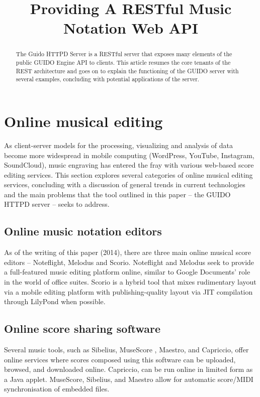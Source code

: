 \documentclass{article}
\title{Providing A RESTful Music Notation Web API}
\date{}
\begin{document}
\maketitle

\begin{abstract}

The Guido HTTPD Server is a RESTful server that exposes many elements of the public GUIDO Engine API to clients.  This article resumes the core tenants of the REST architecture and goes on to explain the functioning of the GUIDO server with several examples, concluding with potential applications of the server.
\end{abstract}


\section{Online musical editing}\label{section:online-musical-editing}
As client-server models for the processing, visualizing and analysis of data become more widespread in mobile computing (WordPress, YouTube, Instagram, SoundCloud), music engraving has entered the fray with various web-based score editing services.  This section explores several categories of online musical editing services, concluding with a discussion of general trends in current technologies and the main problems that the tool outlined in this paper -- the GUIDO HTTPD server -- seeks to address.
\subsection{Online music notation editors}\label{subsection:editor}
As of the writing of this paper (2014), there are three main online musical score editors -- Noteflight, Melodus and Scorio.  Noteflight and Melodus seek to provide a full-featured music editing platform online, similar to Google Documents' role in the world of office suites.  Scorio is a hybrid tool that mixes rudimentary layout via a mobile editing platform with publishing-quality layout via JIT compilation through LilyPond when possible.
\subsection{Online score sharing software}\label{subsection:sharing}
Several music tools, such as Sibelius, MuseScore \cite{musescore}, Maestro, and Capriccio, offer online services where scores composed using this software can be uploaded, browsed, and downloaded online.  Capriccio, can be run online in limited form as a Java applet.  MuseScore, Sibelius, and Maestro allow for automatic score/MIDI synchronisation of embedded files.
\end{document}
